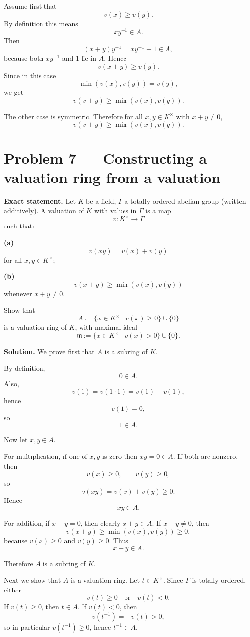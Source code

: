 \documentclass[12pt,a4paper]{article}
\theoremstyle{plain}
\theoremstyle{definition}      %
\begin{document}
Assume first that
\[
v(x)\ge v(y).
\]
By definition this means
\[
xy^{-1}\in A.
\]
Then
\[
(x+y)y^{-1}=xy^{-1}+1\in A,
\]
because both \(xy^{-1}\) and \(1\) lie in \(A\). Hence
\[
v(x+y)\ge v(y).
\]
Since in this case
\[
\min(v(x),v(y))=v(y),
\]
we get
\[
v(x+y)\ge \min(v(x),v(y)).
\]

The other case is symmetric. Therefore for all \(x,y\in K^\times\) with \(x+y\neq 0\),
\[
v(x+y)\ge \min(v(x),v(y)).
\]

\bigskip

\section*{Problem 7 --- Constructing a valuation ring from a valuation}

\textbf{Exact statement.}
Let \(K\) be a field, \(\Gamma\) a totally ordered abelian group (written additively). A valuation of \(K\) with values in \(\Gamma\) is a map
\[
v:K^\times\to \Gamma
\]
such that:

\textbf{(a)}
\[
v(xy)=v(x)+v(y)
\]
for all \(x,y\in K^\times\);

\textbf{(b)}
\[
v(x+y)\ge \min(v(x),v(y))
\]
whenever \(x+y\neq 0\).

Show that
\[
A:=\{x\in K^\times\mid v(x)\ge 0\}\cup\{0\}
\]
is a valuation ring of \(K\), with maximal ideal
\[
\mathfrak m:=\{x\in K^\times\mid v(x)>0\}\cup\{0\}.
\]

\textbf{Solution.}
We prove first that \(A\) is a subring of \(K\).

By definition,
\[
0\in A.
\]
Also,
\[
v(1)=v(1\cdot 1)=v(1)+v(1),
\]
hence
\[
v(1)=0,
\]
so
\[
1\in A.
\]

Now let \(x,y\in A\).

For multiplication, if one of \(x,y\) is zero then \(xy=0\in A\). If both are nonzero, then
\[
v(x)\ge 0,\qquad v(y)\ge 0,
\]
so
\[
v(xy)=v(x)+v(y)\ge 0.
\]
Hence
\[
xy\in A.
\]

For addition, if \(x+y=0\), then clearly \(x+y\in A\). If \(x+y\neq 0\), then
\[
v(x+y)\ge \min(v(x),v(y))\ge 0,
\]
because \(v(x)\ge 0\) and \(v(y)\ge 0\). Thus
\[
x+y\in A.
\]

Therefore \(A\) is a subring of \(K\).

\medskip

Next we show that \(A\) is a valuation ring. Let \(t\in K^\times\). Since \(\Gamma\) is totally ordered, either
\[
v(t)\ge 0
\quad\text{or}\quad
v(t)<0.
\]
If \(v(t)\ge 0\), then \(t\in A\). If \(v(t)<0\), then
\[
v(t^{-1})=-v(t)>0,
\]
so in particular \(v(t^{-1})\ge 0\), hence \(t^{-1}\in A\).
\end{document}
